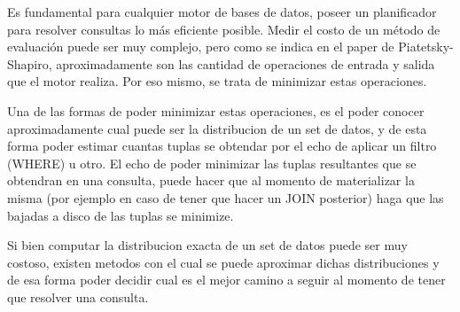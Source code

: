\quad Es fundamental para cualquier motor de bases de datos, poseer un planificador para resolver consultas lo m\'as eficiente posible. Medir el costo de un m\'etodo de evaluaci\'on puede ser muy complejo, pero como se indica en el paper de Piatetsky-Shapiro, aproximadamente son las cantidad de operaciones de entrada y salida que el motor realiza. Por eso mismo, se trata de minimizar estas operaciones.

Una de las formas de poder minimizar estas operaciones, es el poder conocer aproximadamente cual puede ser la distribucion de un set de datos, y de esta forma poder estimar cuantas tuplas se obtendar por el echo de aplicar un filtro (WHERE) u otro. El echo de poder minimizar las tuplas resultantes que se obtendran en una consulta, puede hacer que al momento de materializar la misma (por ejemplo en caso de tener que hacer un JOIN posterior) haga que las bajadas a disco de las tuplas se minimize.

Si bien computar la distribucion exacta de un set de datos puede ser muy costoso, existen metodos con el cual se puede aproximar dichas distribuciones y de esa forma poder decidir cual es el mejor camino a seguir al momento de tener que resolver una consulta.


